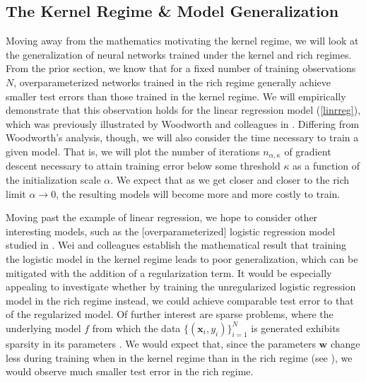 \documentclass{article}
\begin{document}
\subsection{The Kernel Regime \& Model Generalization}
Moving away from the mathematics motivating the kernel regime, we will look at the generalization of neural networks trained under the kernel and rich regimes. From the prior section, we know that for a fixed number of training observations $N$, overparameterized networks trained in the rich regime generally achieve smaller test errors than those trained in the kernel regime. We will empirically demonstrate that this observation holds for the linear regression model (\ref{linrreg}), which was previously illustrated by Woodworth and colleagues in \cite{woodworth2020kernel}. Differing from Woodworth's analysis, though, we will also consider the time necessary to train a given model. That is, we will plot the number of iterations $n_{\alpha, \kappa}$ of gradient descent necessary to attain training error below some threshold $\kappa$ as a function of the initialization scale $\alpha$. We expect that as we get closer and closer to the rich limit $\alpha \rightarrow 0$, the resulting models will become more and more costly to train.

Moving past the example of linear regression, we hope to consider other interesting models, such as the [overparameterized] logistic regression model studied in \cite{wei2019regularization}. Wei and colleagues establish the mathematical result that training the logistic model in the kernel regime leads to poor generalization, which can be mitigated with the addition of a regularization term. It would be especially appealing to investigate whether by training the unregularized logistic regression model in the rich regime instead, we could achieve comparable test error to that of the regularized model. Of further interest are sparse problems, where the underlying model $f$ from which the data $\{(\boldsymbol{x}_i, y_i)\}_{i=1}^N$ is generated exhibits sparsity in its parameters \cite{ma2018priori}. We would expect that, since the parameters $\boldsymbol{w}$ change less during training when in the kernel regime than in the rich regime (see \cite{chizat2018lazy}), we would observe much smaller test error in the rich regime. 
\end{document}
